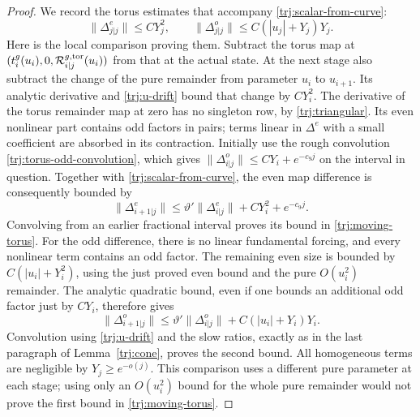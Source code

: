 \begin{proof}
We record the torus estimates that accompany
\eqref{trj:scalar-from-curve}:
\begin{equation}\label{trj:moving-torus}
 \|\Delta^e_{j|j}\|\le CY_j^2,
 \qquad
 \|\Delta^o_{j|j}\|\le C(|u_j|+Y_j)Y_j.
\end{equation}
Here is the local comparison proving them.  Subtract the torus map
at \((t_i^g(u_i),0,\mathcal R^{g,\rm tor}_{i|j}(u_i))\) from that at
the actual state.  At the next stage also subtract the change of the
pure remainder from parameter \(u_i\) to \(u_{i+1}\).  Its analytic
derivative and \eqref{trj:u-drift} bound that change by \(CY_i^2\).
The derivative of the torus remainder map at zero has no singleton
row, by \eqref{trj:triangular}.  Its even nonlinear part contains
odd factors in pairs; terms linear in \(\Delta^e\) with a small
coefficient are absorbed in its contraction.  Initially use the
rough convolution \eqref{trj:torus-odd-convolution}, which gives
\(\|\Delta^o_{i|j}\|\le CY_i+e^{-c_9j}\) on the interval in question.
Together with \eqref{trj:scalar-from-curve}, the even map difference
is consequently bounded by
\[
 \|\Delta^e_{i+1|j}\|
       \le\vartheta'\|\Delta^e_{i|j}\|+CY_i^2+e^{-c_9j}.
\]
Convolving from an earlier fractional interval proves its bound in
\eqref{trj:moving-torus}.  For the odd difference, there is no linear
fundamental forcing, and every nonlinear term contains an odd factor.
The remaining even size is bounded by
\(C(|u_i|+Y_i^2)\), using the just proved even bound and the pure
\(O(u_i^2)\) remainder.  The analytic quadratic bound, even if one
bounds an additional odd factor just by \(CY_i\), therefore gives
\[
 \|\Delta^o_{i+1|j}\|
       \le\vartheta'\|\Delta^o_{i|j}\|
                             +C(|u_i|+Y_i)Y_i.
\]
Convolution using \eqref{trj:u-drift} and the slow ratios, exactly as
in the last paragraph of Lemma~\ref{trj:cone}, proves the second bound.
All homogeneous terms are negligible by \(Y_j\ge e^{-o(j)}\).
This comparison uses a different pure parameter at each stage; using
only an \(O(u_i^2)\) bound for the whole pure remainder would not prove
the first bound in \eqref{trj:moving-torus}.


\end{proof}
